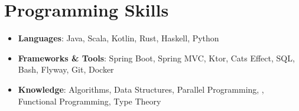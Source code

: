 \documentclass[letterpaper,10pt]{article}
\newcommand{\resumeSubHeadingListStart}{\begin{itemize}[leftmargin=*]}
\newcommand{\resumeSubHeadingListEnd}{\end{itemize}}
\begin{document}
\section{Programming Skills}
 \resumeSubHeadingListStart
   \item{
     \textbf{Languages}{: Java, Scala, Kotlin, Rust, Haskell, Python }
   }\vspace{-7pt}
   \item{
     \textbf{Frameworks \& Tools}{: Spring Boot, Spring MVC, Ktor, Cats Effect, SQL, Bash, Flyway, Git, Docker }
   }
   \vspace{-7pt}
   \item{
     \textbf{Knowledge}{: Algorithms, Data Structures, Parallel Programming, , Functional Programming, Type Theory}
   }
 \resumeSubHeadingListEnd


\end{document}
